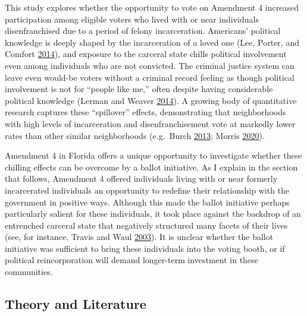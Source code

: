 \documentclass[
  12pt,
]{article}
\begin{document}
This study explores whether the opportunity to vote on Amendment 4 increased participation among eligible voters who lived with or near individuals disenfranchised due to a period of felony incarceration. Americans' political knowledge is deeply shaped by the incarceration of a loved one (Lee, Porter, and Comfort \protect\hyperlink{ref-Lee2014}{2014}), and exposure to the carceral state chills political involvement even among individuals who are not convicted. The criminal justice system can leave even would-be voters without a criminal record feeling as though political involvement is not for ``people like me,'' often despite having considerable political knowledge (Lerman and Weaver \protect\hyperlink{ref-Lerman2014}{2014}). A growing body of quantitative research captures these ``spillover'' effects, demonstrating that neighborhoods with high levels of incarceration and disenfranchisement vote at markedly lower rates than other similar neighborhoods (e.g.~Burch \protect\hyperlink{ref-Burch2013}{2013}; Morris \protect\hyperlink{ref-Morris2020}{2020}).

Amendment 4 in Florida offers a unique opportunity to investigate whether these chilling effects can be overcome by a ballot initiative. As I explain in the section that follows, Amendment 4 offered individuals living with or near formerly incarcerated individuals an opportunity to redefine their relationship with the government in positive ways. Although this made the ballot initiative perhaps particularly salient for these individuals, it took place against the backdrop of an entrenched carceral state that negatively structured many facets of their lives (see, for instance, Travis and Waul \protect\hyperlink{ref-Travis2003}{2003}). It is unclear whether the ballot initiative was sufficient to bring these individuals into the voting booth, or if political reincorporation will demand longer-term investment in these communities.

\hypertarget{theory-and-literature}{%
\subsection*{Theory and Literature}\label{theory-and-literature}}
\end{document}
